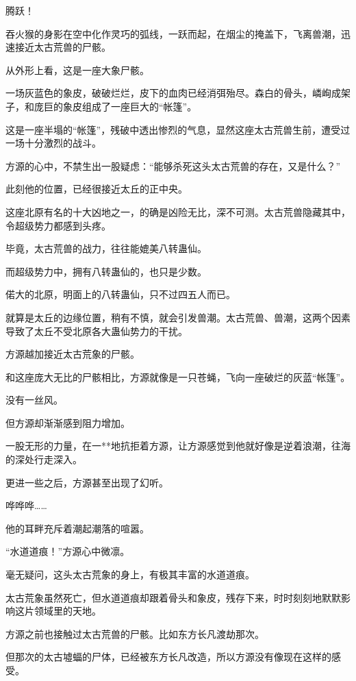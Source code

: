 
\begin{this_body}

腾跃！

吞火猴的身影在空中化作灵巧的弧线，一跃而起，在烟尘的掩盖下，飞离兽潮，迅速接近太古荒兽的尸骸。

从外形上看，这是一座大象尸骸。

一场灰蓝色的象皮，破破烂烂，皮下的血肉已经消弭殆尽。森白的骨头，嶙峋成架子，和庞巨的象皮组成了一座巨大的“帐篷”。

这是一座半塌的“帐篷”，残破中透出惨烈的气息，显然这座太古荒兽生前，遭受过一场十分激烈的战斗。

方源的心中，不禁生出一股疑虑：“能够杀死这头太古荒兽的存在，又是什么？”

此刻他的位置，已经很接近太丘的正中央。

这座北原有名的十大凶地之一，的确是凶险无比，深不可测。太古荒兽隐藏其中，令超级势力都感到头疼。

毕竟，太古荒兽的战力，往往能媲美八转蛊仙。

而超级势力中，拥有八转蛊仙的，也只是少数。

偌大的北原，明面上的八转蛊仙，只不过四五人而已。

就算是太丘的边缘位置，稍有不慎，就会引发兽潮。太古荒兽、兽潮，这两个因素导致了太丘不受北原各大蛊仙势力的干扰。

方源越加接近太古荒象的尸骸。

和这座庞大无比的尸骸相比，方源就像是一只苍蝇，飞向一座破烂的灰蓝“帐篷”。

没有一丝风。

但方源却渐渐感到阻力增加。

一股无形的力量，在一**地抗拒着方源，让方源感觉到他就好像是逆着浪潮，往海的深处行走深入。

更进一些之后，方源甚至出现了幻听。

哗哗哗……

他的耳畔充斥着潮起潮落的喧嚣。

“水道道痕！”方源心中微凛。

毫无疑问，这头太古荒象的身上，有极其丰富的水道道痕。

太古荒象虽然死亡，但水道道痕却跟着骨头和象皮，残存下来，时时刻刻地默默影响这片领域里的天地。

方源之前也接触过太古荒兽的尸骸。比如东方长凡渡劫那次。

但那次的太古墟蝠的尸体，已经被东方长凡改造，所以方源没有像现在这样的感受。


\end{this_body}
